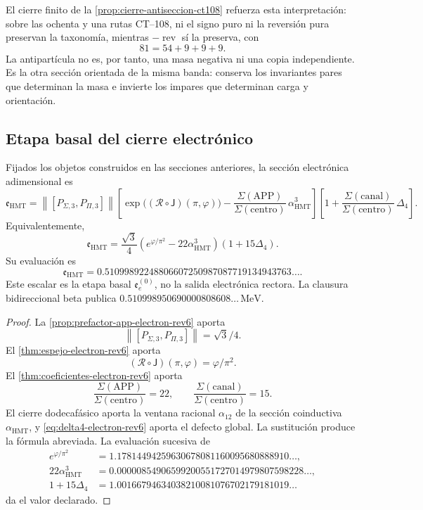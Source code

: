 El cierre finito de la \cref{prop:cierre-antiseccion-ct108} refuerza esta
interpretación: sobre las ochenta y una rutas CT--108, ni el signo puro ni
la reversión pura preservan la taxonomía, mientras
\(-\operatorname{rev}\) sí la preserva, con
\[
 81=54+9+9+9.
\]
La antipartícula no es, por tanto, una masa negativa ni una copia
independiente. Es la otra sección orientada de la misma banda: conserva los
invariantes pares que determinan la masa e invierte los impares que
determinan carga y orientación.

\subsection{Etapa basal del cierre electrónico}

\begin{theorem}
\label{thm:cierre-electron-holografico-rev6}
Fijados los objetos construidos en las secciones anteriores, la sección
electrónica adimensional es
\[
 \mathfrak e_{\mathrm{HMT}}
 =
 \left\|[P_{\Sigma,3},P_{\Pi,3}]\right\|
 \left[
 \exp\bigl((\mathscr R\circ\mathsf J)(\pi,\varphi)\bigr)
 -\frac{\Sigma(\mathrm{APP})}
 {\Sigma(\mathrm{centro})}\,
 \alpha_{\mathrm{HMT}}^3
 \right]
 \left[
 1+
 \frac{\Sigma(\mathrm{canal})}
 {\Sigma(\mathrm{centro})}\,
 \Delta_4
 \right].
\]
Equivalentemente,
\[
 \boxed{
 \mathfrak e_{\mathrm{HMT}}
 =
 \frac{\sqrt3}{4}
 \left(e^{\varphi/\pi^2}
 -22\alpha_{\mathrm{HMT}}^3\right)
 (1+15\Delta_4).}
\]
Su evaluación es
\[
 \boxed{
 \mathfrak e_{\mathrm{HMT}}
 =
 0.51099892248806607250987087719134943763\ldots.}
\]
Este escalar es la etapa basal \(\mathfrak e_e^{(0)}\), no la salida
electrónica rectora. La clausura bidireccional beta publica
\(0.510998950690000808608\ldots\,\mathrm{MeV}\).
\end{theorem}

\begin{proof}
La \cref{prop:prefactor-app-electron-rev6} aporta
\[
 \left\|[P_{\Sigma,3},P_{\Pi,3}]\right\|=\sqrt3/4.
\]
El \cref{thm:espejo-electron-rev6} aporta
\[
 (\mathscr R\circ\mathsf J)(\pi,\varphi)=\varphi/\pi^2.
\]
El \cref{thm:coeficientes-electron-rev6} aporta
\[
 \frac{\Sigma(\mathrm{APP})}{\Sigma(\mathrm{centro})}=22,
 \qquad
 \frac{\Sigma(\mathrm{canal})}{\Sigma(\mathrm{centro})}=15.
\]
El cierre dodecafásico aporta la ventana racional \(\alpha_{12}\) de la
sección coinductiva \(\alpha_{\mathrm{HMT}}\), y
\cref{eq:delta4-electron-rev6} aporta el defecto global. La sustitución
produce la fórmula abreviada. La evaluación sucesiva de
\[
\begin{aligned}
 e^{\varphi/\pi^2}
 &=1.17814494259630678081160095680888910\ldots,\\
 22\alpha_{\mathrm{HMT}}^3
 &=0.00000854906599200551727014979807598228\ldots,\\
 1+15\Delta_4
 &=1.00166794634038210081076702179181019\ldots
\end{aligned}
\]
da el valor declarado.
\end{proof}

